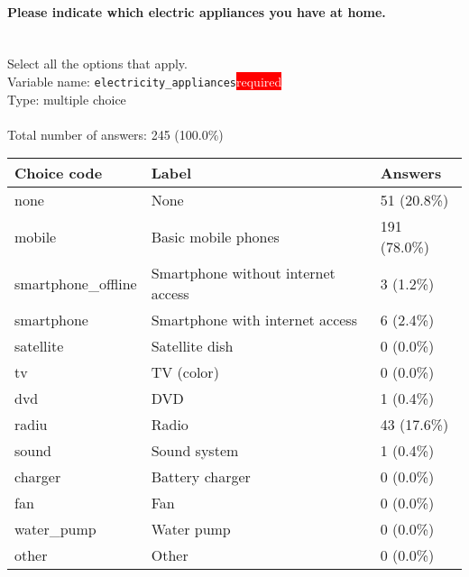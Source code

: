 \documentclass[11.5pt, a4paper]{scrartcl}
\begin{document}
\paragraph{Please indicate which electric appliances you have at home.}
\ \\ {\small Select all the options that apply.}
\  \\Variable name: \texttt{electricity\_appliances}\hfill\colorbox{red}{\small{\textcolor{white}{required}}}\\
 Type: multiple choice\\
\\Total number of answers: 245 (100.0\%)
\\[0.2em] \begin{tabular}{p{4cm}|p{8cm}|p{3cm}}
Choice code & Label & Answers \\
\hline
none & None& \cellcolor{color1}51 (20.8\%)\\
\cellcolor{mygray} mobile & \cellcolor{mygray}Basic mobile phones & \cellcolor{color3}191 (78.0\%)\\
smartphone\_offline & Smartphone without internet access& \cellcolor{color0}3 (1.2\%)\\
\cellcolor{mygray} smartphone & \cellcolor{mygray}Smartphone with internet access & \cellcolor{color0}6 (2.4\%)\\
satellite & Satellite dish& \cellcolor{color0}0 (0.0\%)\\
\cellcolor{mygray} tv  & \cellcolor{mygray}TV (color) & \cellcolor{color0}0 (0.0\%)\\
dvd & DVD& \cellcolor{color0}1 (0.4\%)\\
\cellcolor{mygray} radiu & \cellcolor{mygray}Radio & \cellcolor{color0}43 (17.6\%)\\
sound & Sound system& \cellcolor{color0}1 (0.4\%)\\
\cellcolor{mygray} charger & \cellcolor{mygray}Battery charger & \cellcolor{color0}0 (0.0\%)\\
fan & Fan& \cellcolor{color0}0 (0.0\%)\\
\cellcolor{mygray} water\_pump & \cellcolor{mygray}Water pump & \cellcolor{color0}0 (0.0\%)\\
other & Other& \cellcolor{color0}0 (0.0\%)\\
\end{tabular}
\end{document}
